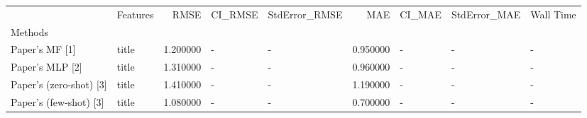 \begin{tabular}{llrllrlll}
 & Features & RMSE & CI_RMSE & StdError_RMSE & MAE & CI_MAE & StdError_MAE & Wall Time \\
Methods &  &  &  &  &  &  &  &  \\
Paper's MF [1] & title & 1.200000 & - & - & 0.950000 & - & - & - \\
Paper's MLP [2] & title & 1.310000 & - & - & 0.960000 & - & - & - \\
Paper's (zero-shot) [3] & title & 1.410000 & - & - & 1.190000 & - & - & - \\
Paper's (few-shot) [3] & title & 1.080000 & - & - & 0.700000 & - & - & - \\
\end{tabular}
